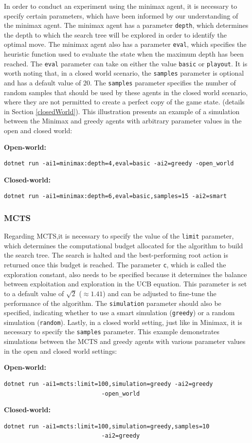 In order to conduct an experiment using the minimax agent, it is necessary to specify certain parameters, which have been informed by our understanding of the minimax agent. The minimax agent has a parameter \texttt{depth}, which determines the depth to which the search tree will be explored in order to identify the optimal move. The minimax agent also has a parameter \texttt{eval}, which specifies the heuristic function used to evaluate the state when the maximum depth has been reached. The \texttt{eval} parameter can take on either the value \texttt{basic} or \texttt{playout}. It is worth noting that, in a closed world scenario, the \texttt{samples} parameter is optional and has a default value of 20. The \texttt{samples} parameter specifies the number of random samples that should be used by these agents in the closed world scenario, where they are not permitted to create a perfect copy of the game state.  (details in Section \ref{closedWorld}). This illustration presents an example of a simulation between the Minimax and greedy agents with arbitrary parameter values in the open and closed world:

\textbf{Open-world: }
\begin{lstlisting}
dotnet run -ai1=minimax:depth=4,eval=basic -ai2=greedy -open_world
\end{lstlisting}

\textbf{Closed-world: }
\begin{lstlisting}
dotnet run -ai1=minimax:depth=6,eval=basic,samples=15 -ai2=smart
\end{lstlisting}

\subsubsection{MCTS}

Regarding MCTS,it is necessary to specify the value of the \texttt{limit} parameter, which determines the computational budget allocated for the algorithm to build the search tree. The search is halted and the best-performing root action is returned once this budget is reached. The parameter \texttt{c}, which is called the exploration constant, also needs to be specified because it determines the balance between exploitation and exploration in the UCB equation. This parameter is set to a default value of  $\sqrt{2}$ ($\approx 1.41$) and can be adjusted to fine-tune the performance of the algorithm. The \texttt{simulation} parameter should also be specified, indicating whether to use a smart simulation (\texttt{greedy}) or a random simulation (\texttt{random}). Lastly, in a closed world setting, just like in Minimax, it is necessary to specify the \texttt{samples} parameter. This example demonstrates simulations between the MCTS and greedy agents with various parameter values in the open and closed world settings:

\textbf{Open-world: }
\begin{lstlisting}
dotnet run -ai1=mcts:limit=100,simulation=greedy -ai2=greedy 
							-open_world
\end{lstlisting}

\textbf{Closed-world: }
\begin{lstlisting}
dotnet run -ai1=mcts:limit=100,simulation=greedy,samples=10 
							-ai2=greedy
\end{lstlisting}





